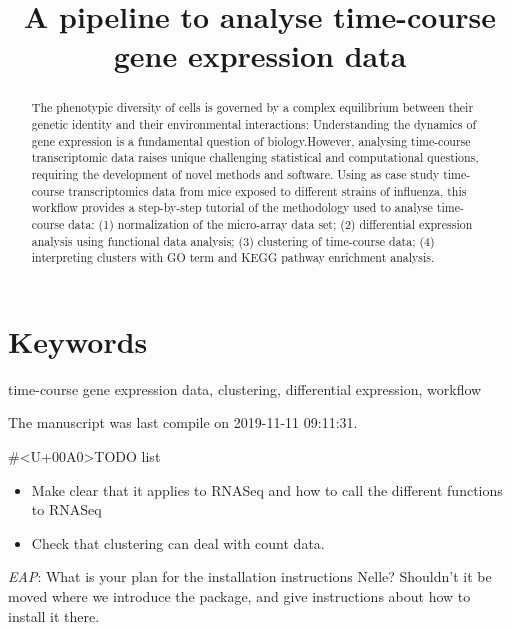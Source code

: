 \documentclass[9pt,a4paper,]{extarticle}
\begin{document}
\pagestyle{front}

\title{A pipeline to analyse time-course gene expression data}


\maketitle
\thispagestyle{front}

\begin{abstract}
The phenotypic diversity of cells is governed by a complex equilibrium between their genetic identity and their environmental interactions: Understanding the dynamics of gene expression is a fundamental question of biology.However, analysing time-course transcriptomic data raises unique challenging statistical and computational questions, requiring the development of novel methods and software. Using as case study time-course transcriptomics data from mice exposed to different strains of influenza, this workflow provides a step-by-step tutorial of the methodology used to analyse time-course data: (1) normalization of the micro-array data set; (2) differential expression analysis using functional data analysis; (3) clustering of time-course data; (4) interpreting clusters with GO term and KEGG pathway enrichment analysis.
\end{abstract}

\section*{Keywords}
time-course gene expression data, clustering, differential expression, workflow


\clearpage
\pagestyle{main}

The manuscript was last compile on 2019-11-11 09:11:31.

\#\textless{}U+00A0\textgreater{}TODO list

\begin{itemize}
\tightlist
\item
  Make clear that it applies to RNASeq and how to call the different functions
  to RNASeq
\item
  Check that clustering can deal with count data.
\end{itemize}

\emph{EAP}: What is your plan for the installation instructions Nelle? Shouldn't it be moved where we introduce the package, and give instructions about how to install it there.
\end{document}
